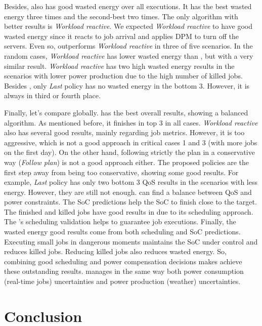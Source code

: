 Besides, \emph{\systemName} also has good wasted energy over all executions. It has the best wasted energy three times and the second-best two times. The only algorithm with better results is \emph{Workload reactive}. We expected \emph{Workload reactive} to have good wasted energy since it reacts to job arrival and applies DPM to turn off the servers. Even so, \emph{\systemName} outperforms \emph{Workload reactive} in three of five scenarios. In the random cases, \emph{Workload reactive} has lower wasted energy than \emph{\systemName}, but with a very similar result. \emph{Workload reactive} has two high wasted energy results in the scenarios with lower power production due to the high number of killed jobs. Besides \emph{\systemName}, only \emph{Last} policy has no wasted energy in the bottom 3. However, it is always in third or fourth place.

Finally, let's compare \emph{\systemName} globally. \emph{\systemName} has the best overall results, showing a balanced algorithm. As mentioned before, it finishes in top 3 in all cases. \emph{Workload reactive} also has several good results, mainly regarding job metrics. However, it is too aggressive, which is not a good approach in critical cases 1 and 3 (with more jobs on the first day). On the other hand, following strictly the plan in a conservative way (\emph{Follow plan}) is not a good approach either. The proposed policies are the first step away from being too conservative, showing some good results. For example, \emph{Last} policy has only two bottom 3 QoS results in the scenarios with less energy. However, they are still not enough. \emph{\systemName} can find a balance between QoS and power constraints. The SoC predictions help the SoC to finish close to the target. The finished and killed jobs have good results in \emph{\systemName} due to its scheduling approach. The \emph{\systemName}'s scheduling validation helps to guarantee job executions. Finally, the wasted energy good results come from both scheduling and SoC predictions. Executing small jobs in dangerous moments maintains the SoC under control and reduces killed jobs. Reducing killed jobs also reduces wasted energy. So, combining good scheduling and power compensation decisions makes \emph{\systemName} achieve these outstanding results. \emph{\systemName} manages in the same way both power consumption (real-time jobs) uncertainties and power production (weather) uncertainties.



\section{Conclusion}

